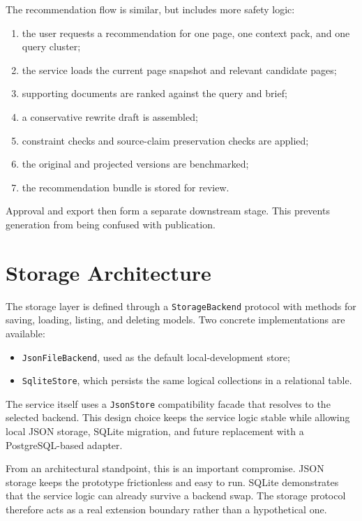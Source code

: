 The recommendation flow is similar, but includes more safety logic:
\begin{enumerate}
    \item the user requests a recommendation for one page, one context pack, and one query cluster;
    \item the service loads the current page snapshot and relevant candidate pages;
    \item supporting documents are ranked against the query and brief;
    \item a conservative rewrite draft is assembled;
    \item constraint checks and source-claim preservation checks are applied;
    \item the original and projected versions are benchmarked;
    \item the recommendation bundle is stored for review.
\end{enumerate}

Approval and export then form a separate downstream stage. This prevents generation from
being confused with publication.

\section{Storage Architecture}

The storage layer is defined through a \texttt{StorageBackend} protocol with methods for saving,
loading, listing, and deleting models. Two concrete implementations are available:
\begin{itemize}
    \item \texttt{JsonFileBackend}, used as the default local-development store;
    \item \texttt{SqliteStore}, which persists the same logical collections in a relational table.
\end{itemize}

The service itself uses a \texttt{JsonStore} compatibility facade that resolves to the selected
backend. This design choice keeps the service logic stable while allowing local JSON storage,
SQLite migration, and future replacement with a PostgreSQL-based adapter.

From an architectural standpoint, this is an important compromise. JSON storage keeps the
prototype frictionless and easy to run. SQLite demonstrates that the service logic can already
survive a backend swap. The storage protocol therefore acts as a real extension boundary rather
than a hypothetical one.

